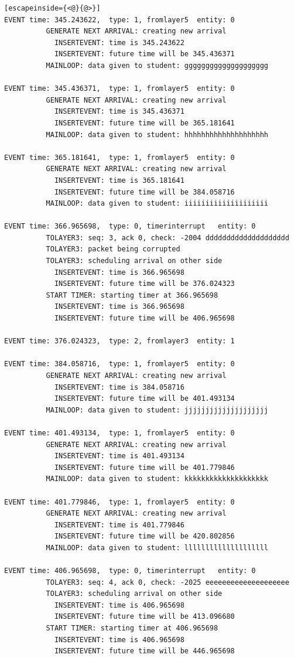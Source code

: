 \documentclass[paper=a4, fontsize=11pt]{scrartcl}
\numberwithin{equation}{section}		%
\numberwithin{figure}{section}			%
\numberwithin{table}{section}				%
\begin{document}
\begin{lstlisting}[escapeinside={<@}{@>}]
EVENT time: 345.243622,  type: 1, fromlayer5  entity: 0
          GENERATE NEXT ARRIVAL: creating new arrival
            INSERTEVENT: time is 345.243622
            INSERTEVENT: future time will be 345.436371
          MAINLOOP: data given to student: gggggggggggggggggggg

EVENT time: 345.436371,  type: 1, fromlayer5  entity: 0
          GENERATE NEXT ARRIVAL: creating new arrival
            INSERTEVENT: time is 345.436371
            INSERTEVENT: future time will be 365.181641
          MAINLOOP: data given to student: hhhhhhhhhhhhhhhhhhhh

EVENT time: 365.181641,  type: 1, fromlayer5  entity: 0
          GENERATE NEXT ARRIVAL: creating new arrival
            INSERTEVENT: time is 365.181641
            INSERTEVENT: future time will be 384.058716
          MAINLOOP: data given to student: iiiiiiiiiiiiiiiiiiii

EVENT time: 366.965698,  type: 0, timerinterrupt   entity: 0
          TOLAYER3: seq: 3, ack 0, check: -2004 dddddddddddddddddddd
          TOLAYER3: packet being corrupted
          TOLAYER3: scheduling arrival on other side
            INSERTEVENT: time is 366.965698
            INSERTEVENT: future time will be 376.024323
          START TIMER: starting timer at 366.965698
            INSERTEVENT: time is 366.965698
            INSERTEVENT: future time will be 406.965698

EVENT time: 376.024323,  type: 2, fromlayer3  entity: 1

EVENT time: 384.058716,  type: 1, fromlayer5  entity: 0
          GENERATE NEXT ARRIVAL: creating new arrival
            INSERTEVENT: time is 384.058716
            INSERTEVENT: future time will be 401.493134
          MAINLOOP: data given to student: jjjjjjjjjjjjjjjjjjjj

EVENT time: 401.493134,  type: 1, fromlayer5  entity: 0
          GENERATE NEXT ARRIVAL: creating new arrival
            INSERTEVENT: time is 401.493134
            INSERTEVENT: future time will be 401.779846
          MAINLOOP: data given to student: kkkkkkkkkkkkkkkkkkkk

EVENT time: 401.779846,  type: 1, fromlayer5  entity: 0
          GENERATE NEXT ARRIVAL: creating new arrival
            INSERTEVENT: time is 401.779846
            INSERTEVENT: future time will be 420.802856
          MAINLOOP: data given to student: llllllllllllllllllll

EVENT time: 406.965698,  type: 0, timerinterrupt   entity: 0
          TOLAYER3: seq: 4, ack 0, check: -2025 eeeeeeeeeeeeeeeeeeee
          TOLAYER3: scheduling arrival on other side
            INSERTEVENT: time is 406.965698
            INSERTEVENT: future time will be 413.096680
          START TIMER: starting timer at 406.965698
            INSERTEVENT: time is 406.965698
            INSERTEVENT: future time will be 446.965698


\end{lstlisting}
\end{document}

